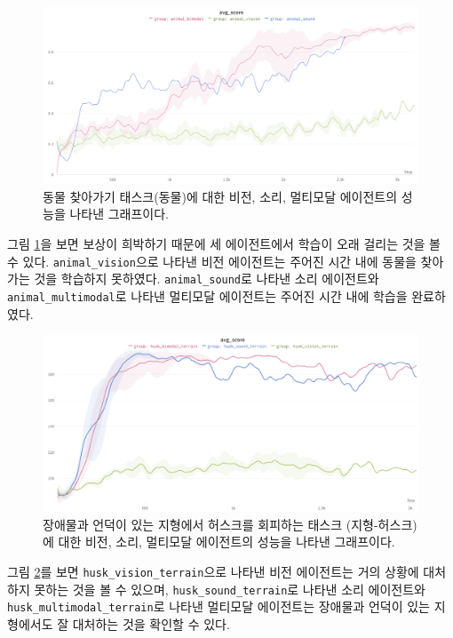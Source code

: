 \documentclass[oneside, under, ko]{snuthesis}
\begin{document}
\begin{figure}[H]
    \centering
    \includegraphics[width=\textwidth]{animal.png}
    \caption{동물 찾아가기 태스크(동물)에 대한 비전, 소리, 멀티모달 에이전트의 성능을 나타낸 그래프이다.}
    \label{fig:animal}
\end{figure}
그림 \ref{fig:animal}을 보면 보상이 희박하기 때문에 세 에이전트에서 학습이 오래 걸리는 것을 볼 수 있다. \lstinline{animal_vision}으로 나타낸 비전 에이전트는 주어진 시간 내에 동물을 찾아가는 것을 학습하지 못하였다. \lstinline{animal_sound}로 나타낸 소리 에이전트와 \lstinline{animal_multimodal}로 나타낸 멀티모달 에이전트는 주어진 시간 내에 학습을 완료하였다.

\begin{figure}[H]
    \centering
    \includegraphics[width=\textwidth]{husk_terrain.png}
    \caption{장애물과 언덕이 있는 지형에서 허스크를 회피하는 태스크 (지형-허스크)에 대한 비전, 소리, 멀티모달 에이전트의 성능을 나타낸 그래프이다. }
    \label{fig:husk_terrain}
\end{figure}
그림 \ref{fig:husk_terrain}를 보면 \lstinline{husk_vision_terrain}으로 나타낸 비전 에이전트는 거의 상황에 대처하지 못하는 것을 볼 수 있으며, \lstinline{husk_sound_terrain}로 나타낸 소리 에이전트와 \lstinline{husk_multimodal_terrain}로 나타낸 멀티모달 에이전트는 장애물과 언덕이 있는 지형에서도 잘 대처하는 것을 확인할 수 있다.
\end{document}
